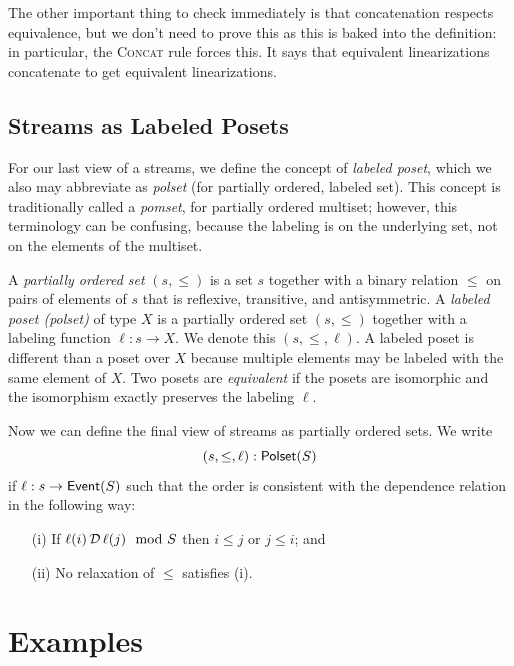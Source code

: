 The other important thing to check immediately is that concatenation respects equivalence, but we don't need to prove this as this is baked into the definition: in particular, the \textsc{Concat} rule forces this. It says that equivalent linearizations concatenate to get equivalent linearizations.

\subsection{Streams as Labeled Posets}
\label{view:labeled-posets}

For our last view of a streams, we define the concept of \emph{labeled poset}, which we also may abbreviate as \emph{polset} (for partially ordered, labeled set). This concept is traditionally called a \emph{pomset}, for partially ordered multiset; however, this terminology can be confusing, because the labeling is on the underlying set, not on the elements of the multiset.

A \emph{partially ordered set} $(s, \le)$ is a set $s$ together with a binary relation $\le$ on pairs of elements of $s$ that is reflexive, transitive, and antisymmetric.
A \emph{labeled poset (polset)} of type $X$ is a
partially ordered set $(s, \le)$ together with a labeling function $\ell: s \to X$.
We denote this $(s, \le, \ell)$. A labeled poset is different than a poset over $X$ because multiple elements may be labeled with the same element of $X$.
Two posets are \emph{equivalent} if the posets are isomorphic and the isomorphism exactly preserves the labeling $\ell$.

Now we can define the final view of streams as partially ordered sets.
We write
\[
(s, \le, \ell): \mathsf{Polset}({S})
\]
if $\ell: s \to \mathsf{Event}(S)$ such that the order is consistent with the dependence
relation in the following way:
\begin{enumerate}
\item[(i)] If $\ell(i) \,\mathcal{D}\, \ell(j) \mod {S}$ then $i \le j$ or $j \le i$; and
\item[(ii)] No relaxation of $\le$ satisfies (i).
\end{enumerate}

\section{Examples}

